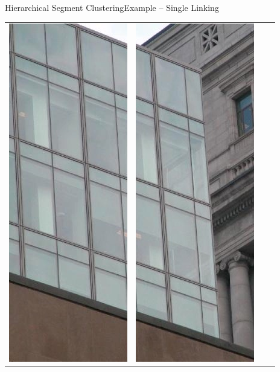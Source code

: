 \documentclass[10pt]{beamer}
\begin{document}
\begin{frame}{Hierarchical Segment Clustering}{Example -- Single Linking}
  {\small 
  \begin{center}
  \setlength{\tabcolsep}{0pt}
	  \begin{tabular}{>{\centering\arraybackslash}b{} >{\centering\arraybackslash}b{}>{\centering\arraybackslash}b{}>{\centering\arraybackslash}b{}}
		    \includegraphics[scale=0.25]{./images/clustering/mcgill_20_segment_1.jpg}
		    & \includegraphics[scale=0.25]{./images/clustering/mcgill_20_segment_2.jpg}

\end{tabular}
\end{center}}
\end{frame}
\end{document}
